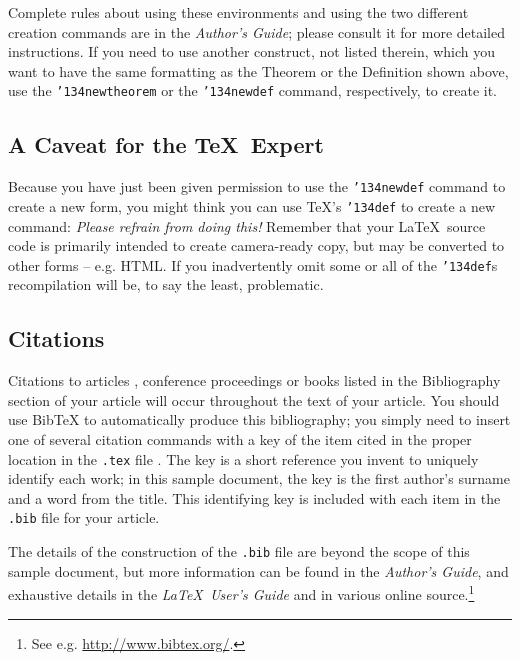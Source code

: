 \documentclass{nime-alternate}
\begin{document}
Complete rules about using these environments and using the
two different creation commands are in the
\textit{Author's Guide}; please consult it for more
detailed instructions.  If you need to use another construct,
not listed therein, which you want to have the same
formatting as the Theorem
or the Definition \cite{salas:calculus} shown above,
use the \texttt{{\char'134}newtheorem} or the
\texttt{{\char'134}newdef} command,
respectively, to create it.

\subsection{A {\secit Caveat} for the \TeX\ Expert}
Because you have just been given permission to
use the \texttt{{\char'134}newdef} command to create a
new form, you might think you can
use \TeX's \texttt{{\char'134}def} to create a
new command: \textit{Please refrain from doing this!}
Remember that your \LaTeX\ source code is primarily intended
to create camera-ready copy, but may be converted
to other forms -- e.g. HTML. If you inadvertently omit
some or all of the \texttt{{\char'134}def}s recompilation will
be, to say the least, problematic.



\subsection{Citations}
Citations to articles \cite{bowman:reasoning,
clark:pct, braams:babel, herlihy:methodology},
conference proceedings \cite{clark:pct} or
books \cite{salas:calculus, Lamport:LaTeX} listed
in the Bibliography section of your
article will occur throughout the text of your article.
You should use BibTeX to automatically produce this bibliography;
you simply need to insert one of several citation commands with
a key of the item cited in the proper location in
the \texttt{.tex} file \cite{Lamport:LaTeX}.
The key is a short reference you invent to uniquely
identify each work; in this sample document, the key is
the first author's surname and a
word from the title.  This identifying key is included
with each item in the \texttt{.bib} file for your article.

The details of the construction of the \texttt{.bib} file
are beyond the scope of this sample document, but more
information can be found in the \textit{Author's Guide},
and exhaustive details in the \textit{\LaTeX\ User's
Guide} \cite{Lamport:LaTeX} and in various online source.\footnote{See e.g. \url{http://www.bibtex.org/}.}
\end{document}
